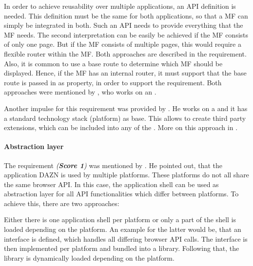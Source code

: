 In order to achieve reusability over multiple applications, an \ac{API} definition is needed.
This definition must be the same for both applications, so that a \ac{MF} can simply be integrated in both.
Such an \ac{API} needs to provide everything that the \ac{MF} needs.
The second interpretation can be easily be achieved if the \ac{MF} consists of only one page.
But if the \ac{MF} consists of multiple pages, this would require a flexible router within the \ac{MF}.
Both approaches are described in the \textit{} requirement.
Also, it is common to use a base route to determine which \ac{MF} should be displayed.
Hence, if the \ac{MF} has an internal router, it must support that the base route is passed in as property, in order to support the \textit{} requirement.
Both approaches were mentioned by \textciteRehm{}, who works on an .

Another impulse for this requirement was provided by \textcite{Grijzen.2019}.
He works on a  and it has a standard technology stack (platform) as base.
This allows to create third party extensions, which can be included into any of the .
More on this approach in \textit{}.



\paragraph{Abstraction layer}\label{cha:requirement_detail_integration_abstraction}

The requirement \textit{ (\textbf{Score 1})} was mentioned by \textciteMezzalira{}.
He pointed out, that the application DAZN is used by multiple platforms.
These platforms do not all share the same browser \ac{API}.
In this case, the application shell can be used as abstraction layer for all \ac{API} functionalities which differ between platforms.
To achieve this, there are two approaches:

Either there is one application shell per platform or only a part of the shell is loaded depending on the platform.
An example for the latter would be, that an interface is defined, which handles all differing browser \ac{API} calls.
The interface is then implemented per platform and bundled into a library.
Following that, the library is dynamically loaded depending on the platform.




